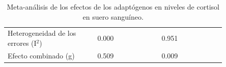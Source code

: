 \begin{table}[H]

\caption{Meta-análisis de los efectos de los adaptógenos en niveles de cortisol en suero sanguíneo.}
\label{tab:meta_análisis_cortisol}

\begin{threeparttable}

{\small{}

\begin{tabular}{M{0.35\linewidth}M{0.25\linewidth}M{0.25\linewidth}}\hline
    
    \theader{} &  &  \\ \hline
    Heterogeneidad de los errores (I$^{2}$) & 0.000 & 0.951 \\
    Efecto combinado (g) & 0.509 & 0.009 \\

    \hline
\end{tabular}

}

\begin{tablenotes}\tiny %
    \item[] 
\end{tablenotes}

\end{threeparttable}
\end{table}